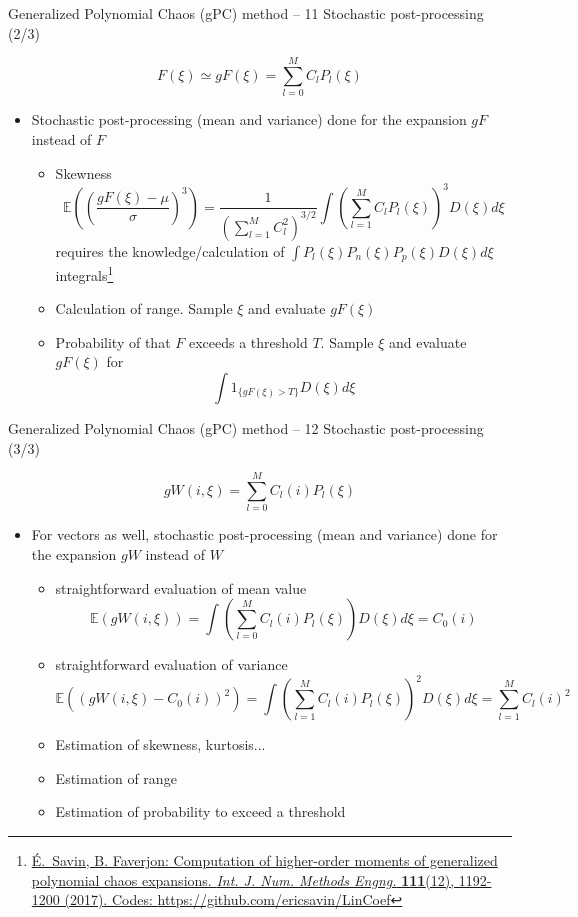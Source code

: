 \documentclass[10pt]{beamer}
\def\vt{\vspace{2mm}}
\def\begit{\begin{itemize}}
\def\endit{\end{itemize}}
\newcommand{\esp}{{\mathbb E}}
\begin{document}
%
\begin{frame}{Generalized Polynomial Chaos (gPC) method -- 11}{ Stochastic post-processing (2/3) }
%
\footnotesize
{
 $$ F(\xi) \simeq gF(\xi) = \sum_{l=0}^{M} C_l P_l(\xi)$$
%
\begit
\item Stochastic post-processing (mean and variance) done for the expansion $gF$ instead of $F$
   \begit 
   \item Skewness 
      $$ \esp\left( \left(\frac{ gF(\xi) -\mu }{\sigma}\right)^3\right) = \frac{1}{ ( \sum_{l=1}^{M} C_l^2)^{3/2}}\int \left( \sum_{l=1}^{M} C_l P_l(\xi) \right)^3 D(\xi) d\xi  $$
 requires the knowledge/calculation of 
        $\int P_l(\xi) P_n(\xi) P_p(\xi) D(\xi) d\xi$ integrals\footnote{\href{\webDOI/10.1002/nme.5505}{\scriptsize{\'E.~Savin, B. Faverjon: Computation of higher-order moments of generalized polynomial chaos expansions. {\sl Int. J. Num. Methods Engng.} {\bf 111}(12), 1192-1200 (2017)}. Codes: \href{https://github.com/ericsavin/LinCoef}{\textsf{https://github.com/ericsavin/LinCoef}}}}
\vt
  \item Calculation of range. Sample $\xi$ and evaluate $gF(\xi)$  
\vt
  \item Probability of that $F$ exceeds a threshold $T$. Sample $\xi$ and evaluate $gF(\xi)$ for 
     $$\int  1_{\{gF(\xi)>T\}} D(\xi) d\xi$$  
   \endit
\endit
%
}
%
\end{frame} 
%
%
\begin{frame}{Generalized Polynomial Chaos (gPC) method -- 12}{ Stochastic post-processing (3/3) }

\footnotesize
{
    $$   gW(i,\xi) = \sum_{l=0}^{M} C_l(i) P_l(\xi)$$
\begit
\item For vectors as well, stochastic post-processing (mean and variance) done for the expansion $gW$ instead of $W$
%
   \begit
   \item straightforward evaluation of mean value
      $$\esp(gW(i,\xi)) = \int \left( \sum_{l=0}^{M} C_l(i) P_l(\xi) \right) D(\xi) d\xi = C_0(i) $$
   \item straightforward evaluation of variance
      $$\esp((gW(i,\xi)-C_0(i))^2)=\int \left( \sum_{l=1}^{M}  C_l(i) P_l(\xi) \right) ^2 D(\xi)d\xi = \sum_{l=1}^{M}  C_l(i)^2 $$
   \item Estimation of skewness, kurtosis... 
   \item Estimation of range
   \item Estimation of probability to exceed a threshold 
   \endit
%
\endit
%
}
%
\end{frame} 
\end{document}
